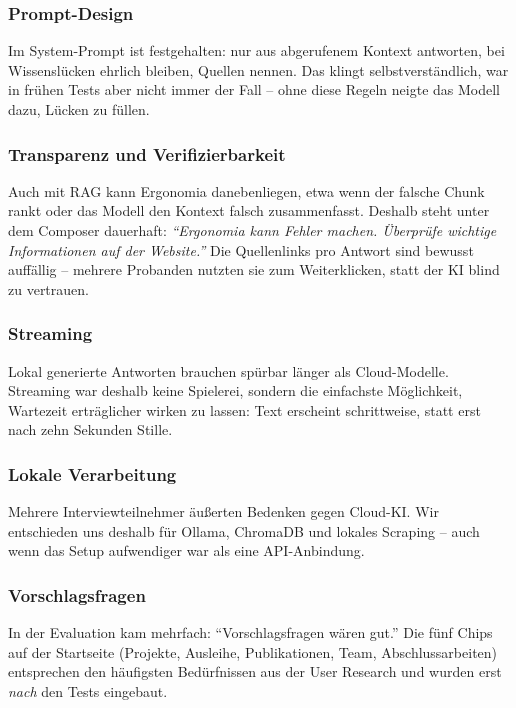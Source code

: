 \subsubsection{Prompt-Design}

Im System-Prompt ist festgehalten: nur aus abgerufenem Kontext antworten, bei Wissenslücken ehrlich bleiben, Quellen nennen. Das klingt selbstverständlich, war in frühen Tests aber nicht immer der Fall -- ohne diese Regeln neigte das Modell dazu, Lücken zu füllen.

\subsubsection{Transparenz und Verifizierbarkeit}

Auch mit RAG kann Ergonomia danebenliegen, etwa wenn der falsche Chunk rankt oder das Modell den Kontext falsch zusammenfasst. Deshalb steht unter dem Composer dauerhaft: \textit{``Ergonomia kann Fehler machen. Überprüfe wichtige Informationen auf der Website.''} Die Quellenlinks pro Antwort sind bewusst auffällig -- mehrere Probanden nutzten sie zum Weiterklicken, statt der KI blind zu vertrauen.

\subsubsection{Streaming}

Lokal generierte Antworten brauchen spürbar länger als Cloud-Modelle. Streaming war deshalb keine Spielerei, sondern die einfachste Möglichkeit, Wartezeit erträglicher wirken zu lassen: Text erscheint schrittweise, statt erst nach zehn Sekunden Stille.

\subsubsection{Lokale Verarbeitung}

Mehrere Interviewteilnehmer äußerten Bedenken gegen Cloud-KI. Wir entschieden uns deshalb für Ollama, ChromaDB und lokales Scraping -- auch wenn das Setup aufwendiger war als eine API-Anbindung.

\subsubsection{Vorschlagsfragen}

In der Evaluation kam mehrfach: ``Vorschlagsfragen wären gut.'' Die fünf Chips auf der Startseite (Projekte, Ausleihe, Publikationen, Team, Abschlussarbeiten) entsprechen den häufigsten Bedürfnissen aus der User Research und wurden erst \emph{nach} den Tests eingebaut.

